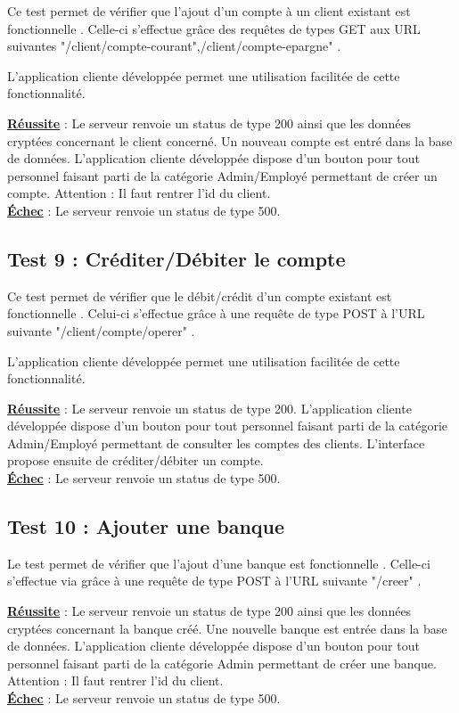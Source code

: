 Ce test permet de vérifier que l'ajout d'un compte à un client existant est fonctionnelle .
Celle-ci s'effectue grâce des requêtes de types GET aux URL suivantes "/client/compte-courant",/client/compte-epargne" .

L'application cliente développée permet une utilisation facilitée de cette fonctionnalité. 

\textbf{\underline{Réussite}} : Le serveur renvoie un status de type 200 ainsi que les données cryptées concernant le client concerné. Un nouveau compte est entré dans la base de données.
L'application cliente développée dispose d'un bouton pour tout personnel faisant parti de la catégorie Admin/Employé permettant de créer un compte.
Attention : Il faut rentrer l'id du client.
\\
\textbf{\underline{Échec}} : Le serveur renvoie un status de type 500.

\subsection{Test 9 : Créditer/Débiter le compte}

Ce test permet de vérifier que le débit/crédit d'un compte existant est fonctionnelle .
Celui-ci s'effectue grâce à une requête de type POST à l'URL suivante "/client/compte/operer" .

L'application cliente développée permet une utilisation facilitée de cette fonctionnalité. 

\textbf{\underline{Réussite}} : Le serveur renvoie un status de type 200.
L'application cliente développée dispose d'un bouton pour tout personnel faisant parti de la catégorie Admin/Employé permettant de consulter les comptes des clients.
L'interface propose ensuite de créditer/débiter un compte.
\\
\textbf{\underline{Échec}} : Le serveur renvoie un status de type 500.

\subsection{Test 10 : Ajouter une banque}

Le test permet de vérifier que l'ajout d'une banque est fonctionnelle .
Celle-ci s'effectue via grâce à une requête de type POST à l'URL suivante "/creer" .

\textbf{\underline{Réussite}} : Le serveur renvoie un status de type 200 ainsi que les données cryptées concernant la banque créé. Une nouvelle banque est entrée dans la base de données.
L'application cliente développée dispose d'un bouton pour tout personnel faisant parti de la catégorie Admin permettant de créer une banque.
Attention : Il faut rentrer l'id du client.
\\
\textbf{\underline{Échec}} : Le serveur renvoie un status de type 500.


